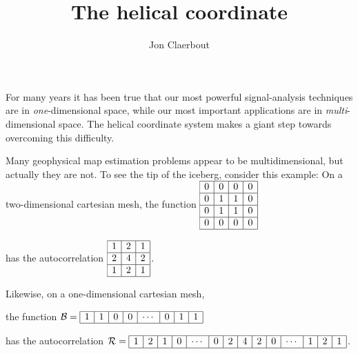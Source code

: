 
\title{The helical coordinate}
\author{Jon Claerbout}
\maketitle
\label{paper:hlx}

For many years it has been true that
our most powerful signal-analysis techniques
are in {\em  one}-dimensional space,
while our most important applications are in {\em  multi}-dimensional space.
The helical coordinate system makes a giant step
towards overcoming this difficulty.

\par
Many geophysical map estimation problems appear to be multidimensional,
but actually they are not.
To see the tip of the iceberg, consider this example:
On a two-dimensional cartesian mesh, the function
$
\begin{array}{|r|r|r|r|}
        \hline
        0 & 0 & 0 &0 \\
        \hline
        0 & 1 & 1 &0 \\
        \hline
        0 & 1 & 1 &0 \\
        \hline
        0 & 0 & 0 &0 \\
        \hline
\end{array}
$
\par\noindent
has the autocorrelation
$
\begin{array}{|r|r|r|} \hline
        1 & 2 & 1\\
        \hline
        2 & 4 & 2\\
        \hline
        1 & 2 & 1
        \\ \hline
\end{array}
$.

\par\noindent
Likewise, on a one-dimensional cartesian mesh,
\par\noindent
the function $
\mathcal{B} =
\begin{array}{|r|r|r|r|r|r|r|r|r|r|r|r|r|} \hline
 1&1&0&0& \cdots& 0& 1&1
        \\ \hline
\end{array}
$
\par\noindent
has the autocorrelation
$ \mathcal{R} =
\begin{array}{|r|r|r|r|r|r|r|r|r|r|r|r|r|r|r|r|r|r|r|} \hline
 1&2&1&0&\cdots&0&2&4&2&0&\cdots&1&2&1
        \\ \hline
\end{array}
$.



